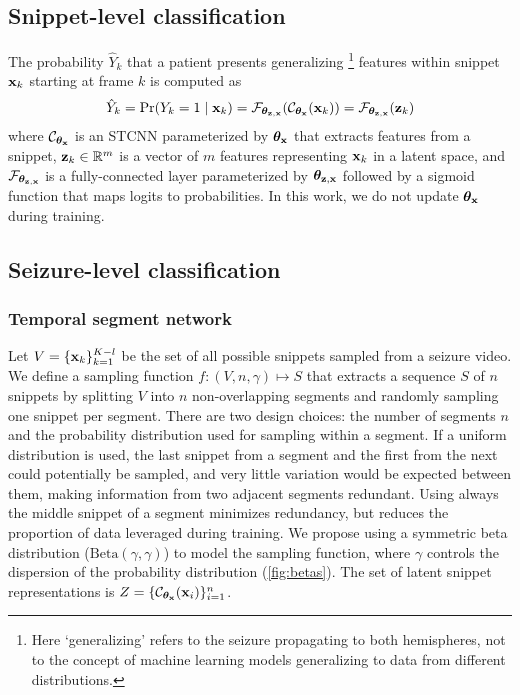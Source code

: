 \subsection{Snippet-level classification}
\label{sec:snippet-level}

The probability $\hat{Y}_k$ that a patient presents generalizing%
\footnote{Here `generalizing' refers to the seizure propagating to both hemispheres, not to the concept of machine learning models generalizing to data from different distributions.}
features within snippet $\mathbf{x}_k$ starting at frame $k$ is computed as
\begin{equation}
    \hat{Y}_k = \Pr(Y_k = 1 \mid \mathbf{x}_k) = \mathcal{F}_{\bm{\theta}_{\mathbf{z},\mathbf{x}}}( \mathcal{C}_{\bm{\theta}_{\mathbf{x}}}(\mathbf{x}_k) ) = \mathcal{F}_{\bm{\theta}_{\mathbf{z},\mathbf{x}}}( \mathbf{z}_k)
\end{equation}
where
$\mathcal{C}_{\bm{\theta}_{\mathbf{x}}}$ is an \ac{STCNN} parameterized by $\bm{\theta}_{\mathbf{x}}$ that extracts features from a snippet,
$\mathbf{z}_k \in \mathbb{R} ^ m$ is a vector of $m$ features representing $\mathbf{x}_k$ in a latent space,
and
$\mathcal{F}_{\bm{\theta}_{\mathbf{z},\mathbf{x}}}$ is a fully-connected layer parameterized by $\bm{\theta}_{\mathbf{z},\mathbf{x}}$ followed by a sigmoid function that maps logits to probabilities.
In this work, we do not update $\bm{\theta}_{\mathbf{x}}$ during training.


\subsection{Seizure-level classification}
\label{sec:meth_seizure}

\subsubsection{Temporal segment network}
Let $V = \{ \mathbf{x}_k \}_{k=1}^{K-l}$ be the set of all possible snippets sampled from a seizure video.
We define a sampling function $f : (V, n, \gamma) \mapsto S$ that extracts a sequence $S$ of $n$ snippets by splitting $V$ into $n$ non-overlapping segments and randomly sampling one snippet per segment.
There are two design choices: the number of segments $n$ and the probability distribution used for sampling within a segment.
If a uniform distribution is used, the last snippet from a segment and the first from the next could potentially be sampled, and very little variation would be expected between them, making information from two adjacent segments redundant.
Using always the middle snippet of a segment minimizes redundancy, but reduces the proportion of data leveraged during training.
We propose using a symmetric beta distribution ($\text{Beta}(\gamma, \gamma)$) to model the sampling function, where $\gamma$ controls the dispersion of the probability distribution (\cref{fig:betas}).
The set of latent snippet representations is $Z = \{ \mathcal{C}_{\bm{\theta}_{\mathbf{x}}} (\mathbf{x}_i) \}_{i = 1}^{n}$.


